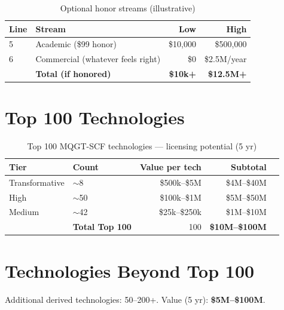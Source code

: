\documentclass[11pt,a4paper]{article}
\begin{document}
\begin{table}[htbp]
\centering
\caption{Optional honor streams (illustrative)}
\begin{tabular}{llrr}
\toprule
\textbf{Line} & \textbf{Stream} & \textbf{Low} & \textbf{High} \\
\midrule
5 & Academic (\$99 honor) & \$10,000 & \$500,000 \\
6 & Commercial (whatever feels right) & \$0 & \$2.5M/year \\
\midrule
& \textbf{Total (if honored)} & \textbf{\$10k+} & \textbf{\$12.5M+} \\
\bottomrule
\end{tabular}
\end{table}

\section{Top 100 Technologies}

\begin{table}[htbp]
\centering
\caption{Top 100 MQGT-SCF technologies — licensing potential (5 yr)}
\begin{tabular}{llrrr}
\toprule
\textbf{Tier} & \textbf{Count} & \textbf{Value per tech} & \textbf{Subtotal} \\
\midrule
Transformative & $\sim$8 & \$500k--\$5M & \$4M--\$40M \\
High & $\sim$50 & \$100k--\$1M & \$5M--\$50M \\
Medium & $\sim$42 & \$25k--\$250k & \$1M--\$10M \\
\midrule
& \textbf{Total Top 100} & 100 & \textbf{\$10M--\$100M} \\
\bottomrule
\end{tabular}
\end{table}

\section{Technologies Beyond Top 100}

Additional derived technologies: 50--200+. Value (5 yr): \textbf{\$5M--\$100M}.

\end{document}
